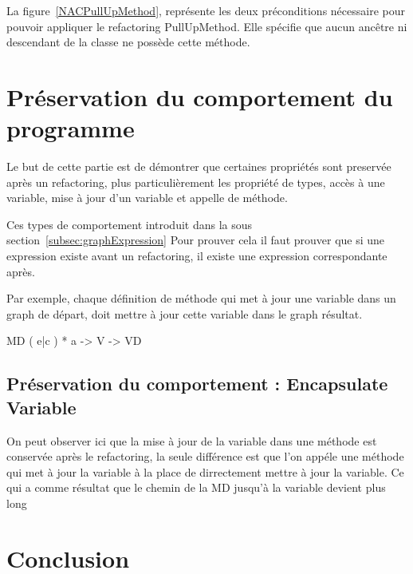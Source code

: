\documentclass[a4paper, 12pt]{article}
\begin{document}
La figure~\ref{NACPullUpMethod}, représente les deux préconditions nécessaire pour pouvoir appliquer le refactoring PullUpMethod.
Elle spécifie que aucun ancêtre ni descendant de la classe ne possède cette méthode.

\section{Préservation du comportement du programme}

Le but de cette partie est de démontrer que certaines propriétés sont preservée après un refactoring, plus particulièrement les propriété de types, accès à une variable, mise à jour d'un variable et appelle de méthode.

Ces types de comportement introduit dans la sous section~\ref{subsec:graphExpression} 
Pour prouver cela il faut prouver que si une expression existe avant un refactoring, il existe une expression correspondante après. 

Par exemple, chaque définition de méthode qui met à jour une variable dans un graph de départ, doit mettre à jour cette variable dans le graph résultat.

MD ( e|c ) * a -> V -> VD

\subsection{Préservation du comportement : Encapsulate Variable}

On peut observer ici que la mise à jour de la variable dans une méthode est conservée après le refactoring, la seule différence est que l'on appéle une méthode qui met à jour la variable à la place de
dirrectement mettre à jour la variable. Ce qui a comme résultat que le chemin de la MD jusqu'à la variable devient plus long


\section{Conclusion}
\end{document}
